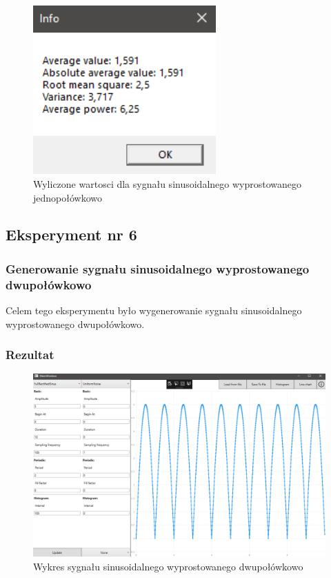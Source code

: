 \documentclass[12pt]{article}
\begin{document}
\begin{figure}[H]
 \centering
 \includegraphics[width=7cm]{images/half1info.PNG}
 \vspace{-0.3cm}
 \caption{Wyliczone wartosci dla sygnału sinusoidalnego wyprostowanego jednopołówkowo}
 \label{gui}
\end{figure}




\subsection{Eksperyment nr 6 }
\subsubsection{Generowanie sygnału sinusoidalnego wyprostowanego dwupołówkowo}
Celem tego eksperymentu było wygenerowanie sygnału sinusoidalnego wyprostowanego dwupołówkowo.

\subsubsection{Rezultat}

\begin{figure}[H]
 \centering
 \includegraphics[width=14cm]{images/full1.PNG}
 \vspace{-0.3cm}
 \caption{Wykres sygnału sinusoidalnego wyprostowanego dwupołówkowo}
 \label{gui}
\end{figure}
\end{document}
